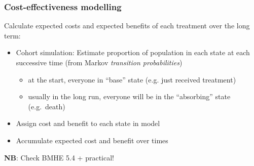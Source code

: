 
\begin{frame}
\frametitle{Cost-effectiveness modelling}

Calculate \alert{expected costs} and \alert{expected benefits} of each
treatment over the long term:

\begin{itemize}

\item \alert{Cohort simulation:} Estimate proportion of population in each state at each successive time
  (from Markov \emph{transition probabilities})
  \begin{itemize}
  \item at the start, everyone in ``base'' state (e.g. just received treatment) 
  \item usually in the long run, everyone will be in the ``absorbing'' state (e.g.~death)
  \end{itemize}
\vspace{10pt}

\item Assign cost and benefit to each state in model 
\vspace{10pt}

\item Accumulate expected cost and benefit over times

\end{itemize}

\vfill \footnotesize \textbf{NB}: Check BMHE 5.4 + practical!
  
\end{frame}


